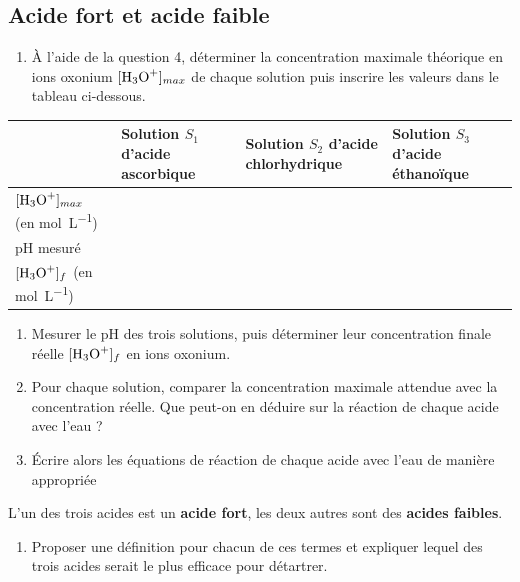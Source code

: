 \documentclass[a4paper,11pt,fleqn]{article}%
\begin{document}
	\subsection{Acide fort et acide faible}
	\begin{enumerate}[resume]
		\item À l’aide de la question 4, déterminer la concentration maximale théorique en ions oxonium $[\ce{H3O+}]_{max}$ de chaque solution puis inscrire les valeurs dans le tableau ci-dessous. 
	\end{enumerate}
	\begin{tabular}{|>{\centering}m{5cm}|>{\centering}m{4.2cm}|>{\centering}m{4.2cm}|>{\centering\arraybackslash}m{4.1cm}|}
	\hline & Solution $S_1$ d'acide ascorbique & Solution $S_2$ d'acide chlorhydrique & Solution $S_3$ d'acide éthanoïque\\
	\hline $[\ce{H3O+}]_{max}$ (en \unit{\mole \per \liter}) & & & \rule[1cm]{0cm}{0cm}\\
	\hline pH mesuré & & & \rule[1cm]{0cm}{0cm}\\
	\hline $[\ce{H3O+}]_{f}$ (en \unit{\mole \per \liter}) & & & \rule[1cm]{0cm}{0cm}\\
	\hline
	\end{tabular}
	\begin{enumerate}[resume]
		\item Mesurer le pH des trois solutions, puis déterminer leur concentration finale réelle $[\ce{H3O+}]_f$ en ions oxonium. 
		\item Pour chaque solution, comparer la concentration maximale attendue avec la concentration réelle. Que peut-on en déduire sur la réaction de chaque acide avec l’eau ?
		\item Écrire alors les équations de réaction de chaque acide avec l’eau de manière appropriée
		\end{enumerate}
L’un des trois acides est un \textbf{acide fort}, les deux autres sont des \textbf{acides faibles}.
	\begin{enumerate}[resume]
	\item Proposer une définition pour chacun de ces termes et expliquer lequel des trois acides serait le plus efficace pour détartrer. 
	\end{enumerate}
\end{document}
